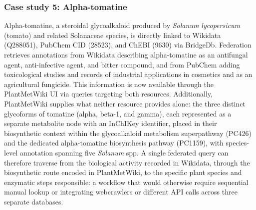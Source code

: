 \documentclass[11pt,a4paper]{article}
\begin{document}
\subsubsection*{Case study 5: Alpha-tomatine}
\vspace*{-1em}
Alpha-tomatine, a
steroidal glycoalkaloid produced by \textit{Solanum lycopersicum} (tomato) and related Solanaceae
species, is directly linked to Wikidata (Q288051), PubChem CID (28523), and ChEBI (9630) via BridgeDb.
Federation retrieves annotations from Wikidata describing alpha-tomatine as an antifungal agent,
anti-infective agent, and bitter compound, and from PubChem adding toxicological studies and records of
industrial applications in cosmetics and as an agricultural fungicide. This information is now
available through the PlantMetWiki UI via queries targeting both resources. Additionally,
PlantMetWiki supplies what neither resource provides alone: the three distinct glycoforms of tomatine
(alpha, beta-1, and gamma), each represented as a separate metabolite node with an InChIKey
identifier, placed in their biosynthetic context within the glycoalkaloid metabolism superpathway
(PC426) and the dedicated alpha-tomatine biosynthesis pathway (PC1159), with species-level annotation
spanning five \textit{Solanum} spp. A single federated query can therefore traverse from the
biological activity recorded in Wikidata, through the biosynthetic route encoded in PlantMetWiki, to
the specific plant species and enzymatic steps responsible: a workflow that would otherwise require
sequential manual lookup or integrating webcrawlers or different API calls across three separate databases.
\end{document}
